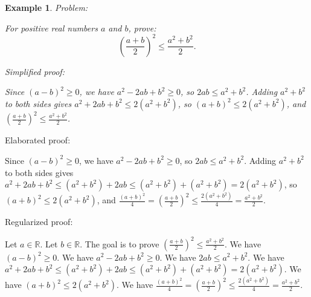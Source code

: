 \documentclass{article}
\newtheorem{example}{Example}
\begin{document}
\begin{example}
Problem:
\begin{tcolorbox}[colback=yellow!10, width=\linewidth]
For positive real numbers $a$ and $b$, prove:
    $$\left(\frac{a+b}{2}\right)^2 \leq \frac{a^2+b^2}{2}.$$
\end{tcolorbox}

Simplified proof:
\begin{tcolorbox}[colback=blue!10, width=\linewidth]
Since $(a-b)^2 \ge 0$, we have $a^2 - 2ab + b^2 \ge 0$, so $2ab \leq a^2 + b^2$.
Adding $a^2+b^2$ to both sides gives $a^2 + 2ab + b^2 \leq 2(a^2+b^2)$, so $(a+b)^2 \leq 2(a^2+b^2)$, and $\left(\frac{a+b}{2}\right)^2 \leq \frac{a^2+b^2}{2}$.
\end{tcolorbox}
\end{example}

Elaborated proof:
\begin{tcolorbox}[colback=green!10, width=\linewidth]
Since $(a-b)^2 \ge 0$, we have $a^2 - 2ab + b^2 \ge 0$, so $2ab \leq a^2 + b^2$.
Adding $a^2+b^2$ to both sides gives $a^2 + 2ab + b^2 \leq (a^2 + b^2) + 2ab \leq (a^2+b^2) + (a^2+b^2) = 2(a^2+b^2)$, so $(a+b)^2 \leq 2(a^2+b^2)$, and $\frac{(a+b)^2}{4} = \left(\frac{a+b}{2}\right)^2 \leq \frac{2(a^2+b^2)}{4} = \frac{a^2+b^2}{2}$.
\end{tcolorbox}

Regularized proof:
\begin{tcolorbox}[colback=red!10, width=\linewidth]
Let $a\in\mathbb{R}$.
Let $b\in\mathbb{R}$.
The goal is to prove ${\left(\frac{a+b}{2}\right)}^2 \leq \frac{a^2+b^2}{2}$.
We have ${(a-b)}^2 \ge 0$.
We have $a^2 - 2ab + b^2 \ge 0$.
We have $2ab \leq a^2 + b^2$.
We have $a^2 + 2ab + b^2 \leq (a^2 + b^2) + 2ab \leq (a^2+b^2) + (a^2+b^2) = 2(a^2+b^2)$.
We have ${(a+b)}^2 \leq 2(a^2+b^2)$.
We have $\frac{{(a+b)}^2}{4} = {\left(\frac{a+b}{2}\right)}^2 \leq \frac{2(a^2+b^2)}{4} = \frac{a^2+b^2}{2}$.
\end{tcolorbox}
\end{document}
